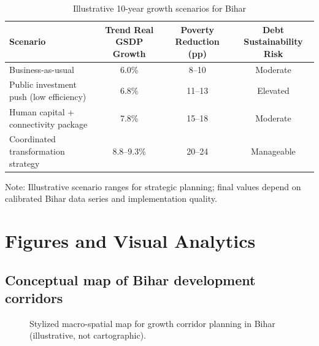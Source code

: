 \documentclass[preprint,12pt]{elsarticle}
\begin{document}
\begin{table}[H]
\centering
\caption{Illustrative 10-year growth scenarios for Bihar}
\label{tab:scenarios}
\begin{threeparttable}
\begin{tabular}{lccc}
\toprule
Scenario & Trend Real GSDP Growth & Poverty Reduction (pp) & Debt Sustainability Risk \\
\midrule
Business-as-usual & 6.0\% & 8--10 & Moderate \\
Public investment push (low efficiency) & 6.8\% & 11--13 & Elevated \\
Human capital + connectivity package & 7.8\% & 15--18 & Moderate \\
Coordinated transformation strategy & 8.8--9.3\% & 20--24 & Manageable \\
\bottomrule
\end{tabular}
\begin{tablenotes}
\item Note: Illustrative scenario ranges for strategic planning; final values depend on calibrated Bihar data series and implementation quality.
\end{tablenotes}
\end{threeparttable}
\end{table}

\section{Figures and Visual Analytics}
\subsection{Conceptual map of Bihar development corridors}
\begin{figure}[H]
\centering
{}
\caption{Stylized macro-spatial map for growth corridor planning in Bihar (illustrative, not cartographic).}
\label{fig:map}
\end{figure}
\end{document}
